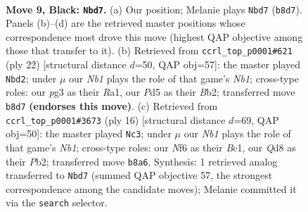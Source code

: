 \documentclass[11pt]{article}
\begin{document}
\clearpage

\begin{figure}[p]\centering
\begin{subfigure}{0.46\textwidth}\centering
\resizebox{\linewidth}{!}{%
\newchessgame
\chessboard[
  setfen={rnbq1rk1/p4ppp/1p2pn2/2pp4/3P4/2PBPNP1/PP4PP/RN1Q1RK1 b - - 0 9},
  showmover=false,
  pgfstyle=straightmove, color=movearrow, markmove={b8-d7}
]}
\caption{}
\end{subfigure}\hfill
\begin{subfigure}{0.46\textwidth}\centering
\resizebox{\linewidth}{!}{%
\newchessgame
\chessboard[
  setfen={r2q1rk1/pp1n2p1/2pbpnpp/3p4/2PP4/1P2PN2/PB3PPP/RN1Q1RK1 w - - 0 12},
  showmover=false,
  pgfstyle=straightmove, color=movearrow, markmove={b1-d2}
]}
\caption{}
\end{subfigure}
\\[4pt]
\begin{subfigure}{0.46\textwidth}\centering
\resizebox{\linewidth}{!}{%
\newchessgame
\chessboard[
  setfen={rnbq1rk1/pp4pp/2pbpn2/3p1p2/2PP4/5NP1/PPQ1PPBP/RNB2RK1 w - - 3 9},
  showmover=false,
  pgfstyle=straightmove, color=movearrow, markmove={b1-c3}
]}
\caption{}
\end{subfigure}\hfill

\caption{\textbf{Move 9, Black: \texttt{Nbd7}.} (a) Our position; Melanie plays \texttt{Nbd7} (\texttt{b8d7}). Panels (b)--(d) are the retrieved master positions whose correspondence most drove this move (highest QAP objective among those that transfer to it). (b) Retrieved from \texttt{ccrl\_top\_p0001\#621} (ply 22) [structural distance $d$=50, QAP obj=57]: the master played \texttt{Nbd2}; under $\mu$ our \emph{Nb1} plays the role of that game's \emph{Nb1}; cross-type roles: our \emph{p}g3 as their \emph{R}a1, our \emph{P}d5 as their \emph{B}b2; transferred move \texttt{b8d7} \textbf{(endorses this move)}. (c) Retrieved from \texttt{ccrl\_top\_p0001\#3673} (ply 16) [structural distance $d$=69, QAP obj=50]: the master played \texttt{Nc3}; under $\mu$ our \emph{Nb1} plays the role of that game's \emph{Nb1}; cross-type roles: our \emph{N}f6 as their \emph{B}c1, our \emph{Q}d8 as their \emph{P}b2; transferred move \texttt{b8a6}. Synthesis: 1 retrieved analog transferred to \texttt{Nbd7} (summed QAP objective 57, the strongest correspondence among the candidate moves); Melanie committed it via the \texttt{search} selector.}
\label{fig:thought-m17}
\end{figure}

\clearpage
\end{document}

